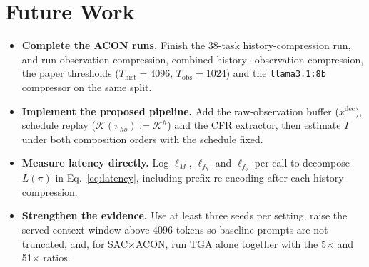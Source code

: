 \documentclass[10pt,a4paper]{article}
\begin{document}
\section{Future Work}

\begin{itemize}
\item \textbf{Complete the ACON runs.} Finish the 38-task history-compression
run, and run observation compression, combined history+observation
compression, the paper thresholds ($T_{\mathrm{hist}}=4096$,
$T_{\mathrm{obs}}=1024$) and the \texttt{llama3.1:8b} compressor on the same
split.
\item \textbf{Implement the proposed pipeline.} Add the raw-observation
buffer ($x^{\mathrm{dec}}$), schedule replay ($\mathcal{K}(\pi_{ho}):=\mathcal{K}^{h}$)
and the CFR extractor, then estimate $I$ under both composition orders with
the schedule fixed.
\item \textbf{Measure latency directly.} Log $\ell_M$, $\ell_{f_h}$ and
$\ell_{f_o}$ per call to decompose $L(\pi)$ in Eq.~\eqref{eq:latency},
including prefix re-encoding after each history compression.
\item \textbf{Strengthen the evidence.} Use at least three seeds per setting,
raise the served context window above 4096 tokens so baseline prompts are not
truncated, and, for SAC$\times$ACON, run TGA alone together with the 5$\times$
and 51$\times$ ratios.
\end{itemize}
\end{document}
